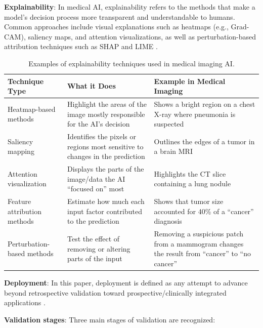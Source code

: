 \documentclass{article}
\begin{document}
\textbf{Explainability}: In medical AI, explainability refers to the methods that make a model's decision process more transparent and understandable to humans. Common approaches include visual explanations such as heatmaps (e.g., Grad-CAM), saliency maps, and attention visualizations, as well as perturbation-based attribution techniques such as SHAP and LIME \cite{biswas_2024_a}.

\begin{table}[htbp]
\centering
\renewcommand{\arraystretch}{2.0} %
\normalsize %
\begin{tabular}{p{3cm} p{6cm} p{6cm}}
\hline
\textbf{Technique Type} & \textbf{What it Does} & \textbf{Example in Medical Imaging} \\
\hline
Heatmap-based methods & Highlight the areas of the image mostly responsible for the AI’s decision & Shows a bright region on a chest X-ray where pneumonia is suspected \\[0.5em]
Saliency mapping & Identifies the pixels or regions most sensitive to changes in the prediction & Outlines the edges of a tumor in a brain MRI \\[0.5em]
Attention visualization & Displays the parts of the image/data the AI “focused on” most & Highlights the CT slice containing a lung nodule \\[0.5em]
Feature attribution methods & Estimate how much each input factor contributed to the prediction & Shows that tumor size accounted for 40\% of a ``cancer'' diagnosis \\[0.5em]
Perturbation-based methods & Test the effect of removing or altering parts of the input & Removing a suspicious patch from a mammogram changes the result from ``cancer'' to ``no cancer'' \\
\hline
\end{tabular}
\caption{Examples of explainability techniques used in medical imaging AI.}
\label{tab:xai_techniques}
\end{table}


\newline

\textbf{Deployment}: In this paper, deployment is defined as any attempt to advance beyond retrospective validation toward prospective/clinically integrated applications \cite{vasey_2022_reporting}.
\newline

\textbf{Validation stages}:  Three main stages of validation are recognized:
\end{document}

